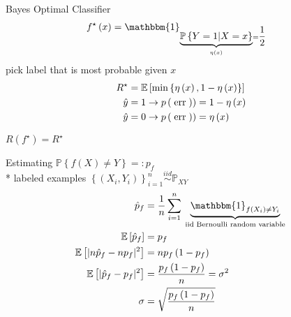 \documentclass{article}
\begin{document}
Bayes Optimal Classifier
\begin{align*}
f^\star \left(x\right) &= \mathbbm{1}_{\underbrace{\mathbb{P}\left\{Y = 1 | X = x\right\}}_{\eta\left(x\right)} = \dfrac{1}{2}}
\end{align*}
pick label that is most probable given $x $
\begin{align*}
R^\star  &= \mathbb{E}\left[\displaystyle\min\left\{\eta\left(x\right), 1 - \eta\left(x\right)\right\}\right]
\\ \hat{y} &= 1 \to  p\left(\text{\;err\;}\right) ) = 1 - \eta\left(x\right)
\\ \hat{y} &= 0 \to  p\left(\text{\;err\;}\right) ) = \eta\left(x\right)
\end{align*}
\begin{thm} \label{thm:rfr} 
$R\left(f^\star \right) = R^\star $
\end{thm}
Estimating $\mathbb{P}\left\{f\left(X\right) \neq  Y\right\} =: p_{f}$
\\* labeled examples $\left\{\left(X_{i}, Y_{i}\right)\right\}_{i=1}^{n} \stackrel{iid}{\sim} \mathbb{P}_{XY}$
\begin{align*}
\hat{p}_{f} &= \dfrac{1}{n} \displaystyle\sum_{i=1}^{n} \underbrace{\mathbbm{1}_{f\left(X_{i}\right) \neq  Y_{i}}}_{\text{\;iid Bernoulli random variable\;}}
\\ \mathbb{E}\left[\hat{p}_{f}\right] &= p_{f}
\\ \mathbb{E}\left[| n \hat{p}_{f} - n p_{f} |^{2}\right] &= n p_{f} \left(1 - p_{f}\right)
\\ \mathbb{E}\left[| \hat{p}_{f} - p_{f} |^{2}\right] &= \dfrac{p_{f} \left(1 - p_{f}\right)}{n} = \sigma^{2}
\\ \sigma &= \sqrt{\dfrac{p_{f} \left(1 - p_{f}\right)}{n}}
\end{align*}

\begin{figure}[H] \centering {} 
\end{figure}
\end{document}
